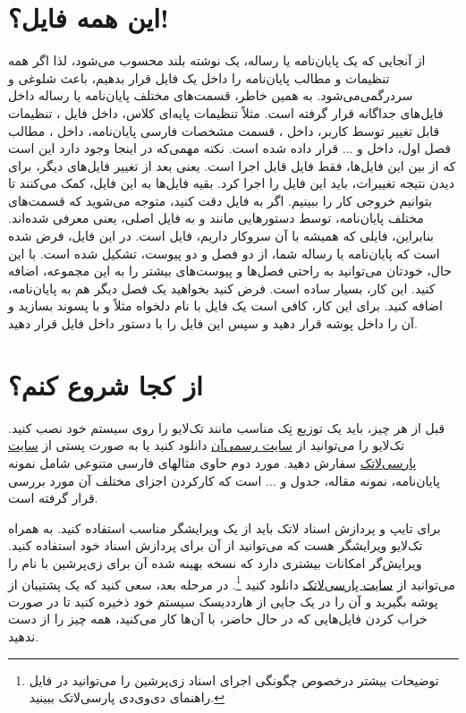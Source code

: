 \section{این همه فایل؟!}\label{sec2}
از آنجایی که یک پایان‌نامه یا رساله، یک نوشته بلند محسوب می‌شود، لذا اگر همه تنظیمات و مطالب پایان‌نامه را داخل یک فایل قرار بدهیم، باعث شلوغی
و سردرگمی‌می‌شود. به همین خاطر، قسمت‌های مختلف پایان‌نامه یا رساله  داخل فایل‌های جداگانه قرار گرفته است. مثلاً تنظیمات پایه‌ای کلاس، داخل فایل
، 
تنظیمات قابل تغییر توسط کاربر، داخل 
،
قسمت مشخصات فارسی پایان‌نامه، داخل 
،
مطالب فصل اول، داخل 
و ... قرار داده شده است. نکته مهمی‌که در اینجا وجود دارد این است که از بین این  فایل‌ها، فقط فایل 
قابل اجرا است. یعنی بعد از تغییر فایل‌های دیگر، برای دیدن نتیجه تغییرات، باید این فایل را اجرا کرد. بقیه فایل‌ها به این فایل، کمک می‌کنند تا بتوانیم خروجی کار را ببینیم. اگر به فایل 
دقت کنید، متوجه می‌شوید که قسمت‌های مختلف پایان‌نامه، توسط دستورهایی مانند 
و
به فایل اصلی، یعنی 
معرفی شده‌اند. بنابراین، فایلی که همیشه با آن سروکار داریم، فایل 
است.
در این فایل، فرض شده است که پایان‌نامه یا رساله شما، از دو فصل و دو پیوست، تشکیل شده است. با این حال، خودتان می‌توانید به راحتی فصل‌ها و پیوست‌های بیشتر را به این مجموعه، اضافه کنید. این کار، بسیار ساده است. فرض کنید بخواهید یک فصل دیگر هم به پایان‌نامه، اضافه کنید. برای این کار، کافی است یک فایل با نام دلخواه مثلاً 
و با پسوند 
بسازید و آن را داخل پوشه 
قرار دهید و سپس این فایل را با دستور 
\verb!!
داخل فایل
 قرار دهید.

\section{از کجا شروع کنم؟}
قبل از هر چیز، باید یک توزیع تِک مناسب مانند تک‌لایو
را روی سیستم خود نصب کنید. تک‌لایو  را می‌توانید از 
 \href{http://www.tug.org/texlive}{سایت رسمی‌آن}%
 دانلود کنید یا به صورت پستی از 
 \href{http://www.parsilatex.com}{سایت پارسی‌لاتک}%
سفارش دهید. مورد دوم حاوی مثالهای فارسی متنوعی شامل نمونه پایان‌نامه، نمونه مقاله، جدول و ... است که کارکردن اجزای مختلف آن مورد بررسی قرار گرفته است.

برای تایپ و پردازش اسناد لاتک باید از یک ویرایشگر مناسب استفاده کنید. به همراه تک‌لایو ویرایشگر  هست که می‌توانید از آن برای پردازش اسناد خود استفاده کنید. 
ویرایش‌گر 
امکانات بیشتری دارد که نسخه بهینه شده آن برای زی‌پرشین با نام   را می‌توانید  از 
 \href{http://www.parsilatex.com}{سایت پارسی‌لاتک} 
 دانلود کنید
 \footnote{توضیحات بیشتر درخصوص چگونگی اجرای اسناد زی‌پرشین را می‌توانید در فایل راهنمای دی‌وی‌دی پارسی‌لاتک ببینید.}.
در مرحله بعد، سعی کنید که  یک پشتیبان از پوشه 
 بگیرید و آن را در یک جایی از هارددیسک سیستم خود ذخیره کنید تا در صورت خراب کردن فایل‌هایی که در حال حاضر، با آن‌ها کار می‌کنید، همه چیز را از 
 دست ندهید.
 
